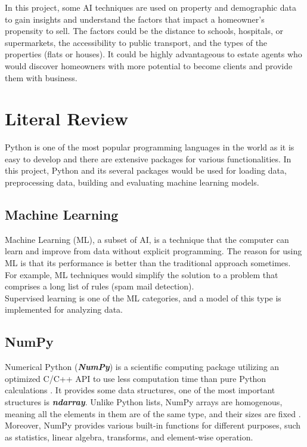 \documentclass[12pt,twoside]{report}
\begin{document}
In this project, some AI techniques are used on property and demographic data to gain insights and understand the factors that impact a homeowner's propensity to sell. The factors could be the distance to schools, hospitals, or supermarkets, the accessibility to public transport, and the types of the properties (flats or houses). It could be highly advantageous to estate agents who would discover homeowners with more potential to become clients and provide them with business. 

\chapter{Literal Review}
Python is one of the most popular programming languages in the world as it is easy to develop and there are extensive packages for various functionalities. In this project, Python and its several packages would be used for loading data, preprocessing data, building and evaluating machine learning models. 

\section{Machine Learning}
Machine Learning (ML), a subset of AI, is a technique that the computer can learn and improve from data without explicit programming. The reason for using ML is that its performance is better than the traditional approach sometimes. For example, ML techniques would simplify the solution to a problem that comprises a long list of rules (spam mail detection).
\\

Supervised learning is one of the ML categories, and a model of this type is implemented for analyzing data. 

\section{NumPy}
Numerical Python (\textit{\textbf{NumPy}}) is a scientific computing package utilizing an optimized C/C++ API to use less computation time than pure Python calculations \citep{RN6}. It provides some data structures, one of the most important structures is \textbf{\emph{ndarray}}. Unlike Python lists, NumPy arrays are homogenous, meaning all the elements in them are of the same type, and their sizes are fixed \citep{RN4}.  Moreover, NumPy provides various built-in functions for different purposes, such as statistics, linear algebra,  transforms, and element-wise operation. 
\\
\end{document}
